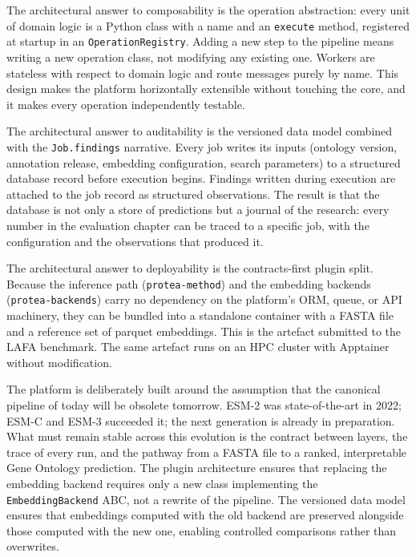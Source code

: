 The architectural answer to composability is the operation abstraction: every unit of
domain logic is a Python class with a name and an \texttt{execute} method, registered
at startup in an \texttt{OperationRegistry}. Adding a new step to the pipeline means
writing a new operation class, not modifying any existing one. Workers are stateless
with respect to domain logic and route messages purely by name. This design makes the
platform horizontally extensible without touching the core, and it makes every
operation independently testable.

The architectural answer to auditability is the versioned data model combined with the
\texttt{Job.findings} narrative. Every job writes its inputs (ontology version,
annotation release, embedding configuration, search parameters) to a structured
database record before execution begins. Findings written during execution are attached
to the job record as structured observations. The result is that the database is not
only a store of predictions but a journal of the research: every number in the
evaluation chapter can be traced to a specific job, with the configuration and the
observations that produced it.

The architectural answer to deployability is the contracts-first plugin split. Because
the inference path (\texttt{protea-method}) and the embedding backends
(\texttt{protea-backends}) carry no dependency on the platform's ORM, queue, or API
machinery, they can be bundled into a standalone container with a FASTA file and a
reference set of parquet embeddings. This is the artefact submitted to the LAFA
benchmark. The same artefact runs on an HPC cluster with Apptainer without
modification.

The platform is deliberately built around the assumption that the canonical pipeline
of today will be obsolete tomorrow. ESM-2 was state-of-the-art in 2022; ESM-C and
ESM-3 succeeded it; the next generation is already in preparation. What must remain
stable across this evolution is the contract between layers, the trace of every run,
and the pathway from a FASTA file to a ranked, interpretable Gene Ontology
prediction. The plugin architecture ensures that replacing the embedding backend
requires only a new class implementing the \texttt{EmbeddingBackend} ABC, not a
rewrite of the pipeline. The versioned data model ensures that embeddings computed
with the old backend are preserved alongside those computed with the new one, enabling
controlled comparisons rather than overwrites.

